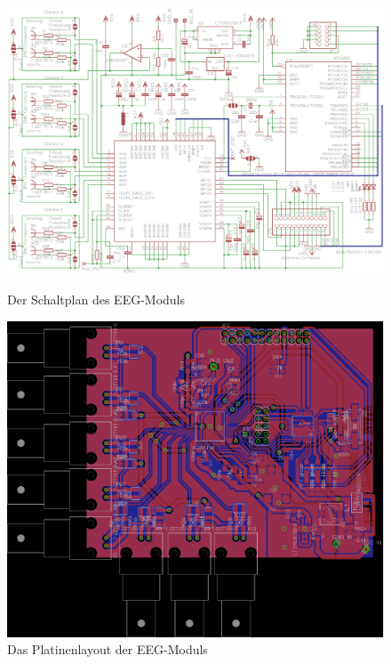 \documentclass[12pt,a4paper,notitlepage]{article}
\begin{document}
\begin{landscape}
\begin{figure}
\begin{center}
\includegraphics{images/adc_schematic_02.eps}
\label{adc_schematic}
\end{center}
\caption{Der Schaltplan des EEG-Moduls}
\end{figure}
\end{landscape}

\begin{figure}
\centering
\includegraphics{images/adc_board_03.eps}%
\caption{Das Platinenlayout der EEG-Moduls}
\label{adc_board}
\end{figure}
\end{document}
